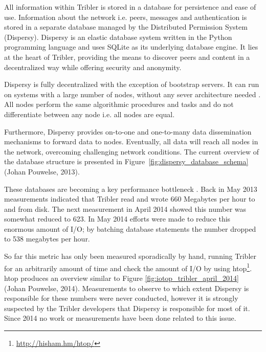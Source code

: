 All information within Tribler is stored in a database for persistence and ease of use.
Information about the network i.e. peers, messages and authentication is stored in a separate database managed by the Distributed Permission System (Dispersy).
Dispersy is an elastic database system written in the Python programming language and uses SQLite as its underlying database engine.
It lies at the heart of Tribler, providing the means to discover peers and content in a decentralized way while offering security and anonymity.

Dispersy is fully decentralized with the exception of bootstrap servers.
It can run on systems with a large number of nodes, without any sever architecture needed \cite{dispersy2016dispersy, zeilemaker2013dispersy}.
All nodes perform the same algorithmic procedures and tasks and do not differentiate between any node i.e. all nodes are equal.

Furthermore, Dispersy provides on-to-one and one-to-many data dissemination mechanisms to forward data to nodes.
Eventually, all data will reach all nodes in the network, overcoming challenging network conditions.
The current overview of the database structure is presented in Figure~\ref{fig:dispersy_database_schema} (Johan Pouwelse, 2013).

These databases are becoming a key performance bottleneck \cite{pouwelse2014reduce}.
Back in May 2013 measurements indicated that Tribler read and wrote 660 Megabytes per hour to and from disk.
The next measurement in April 2014 showed this number was somewhat reduced to 623.
In May 2014 efforts were made to reduce this enormous amount of I/O; by batching database statements the number dropped to 538 megabytes per hour.

So far this metric has only been measured sporadically by hand, running Tribler for an arbitrarily amount of time and check the amount of I/O by using htop\footnote{\url{http://hisham.hm/htop/}}.
htop produces an overview similar to Figure \ref{fig:iotop_tribler_april_2014} (Johan Pouwelse, 2014).
Measurements to observe to which extent Dispersy is responsible for these numbers were never conducted, however it is strongly suspected by the Tribler developers that Dispersy is responsible for most of it.
Since 2014 no work or measurements have been done related to this issue.

